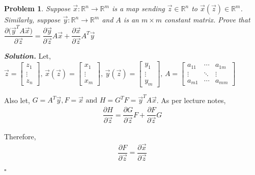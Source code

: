 \documentclass[11pt]{amsart}
\newtheorem{problem}{Problem}
\newenvironment{solution}[1][\it{Solution}]{\textbf{#1. } }{$\square$}
\theoremstyle{definition}
\newcommand{\R}{\mathbb{R}}
\newcommand{\vx}{\vec{x}}
\newcommand{\vy}{\vec{y}}
\newcommand{\vz}{\vec{z}}
\begin{document}
\begin{problem}
Suppose $\vx: \R^n\to \R^m$ is a map  sending $\vz\in \R^n$ to  $\vx(\vz)\in \R^m$. Similarly, 
suppose $\vy: \R^n\to \R^m$ and $A$ is an $m\times m$ constant matrix.
Prove that $\dfrac{\partial \big(\vy^TA\vx\big)}{\partial \vz}=
\dfrac{\partial \vy}{\partial \vz} A \vx+ \dfrac{\partial \vx}{\partial \vz} A^T \vy
$ 
\end{problem}

\begin{solution}
Let, $\vz = \begin{bmatrix}z_1\\\vdots\\z_n\end{bmatrix} \text{, } \vx(\vz) = \begin{bmatrix}x_1\\\vdots\\x_m\end{bmatrix} \text{, } \vy(\vz) = \begin{bmatrix}y_1\\\vdots\\y_m\end{bmatrix} \text{, } A = \left[\begin{array}{ccc}a_{11} & \cdots & a_{1m} \\ \vdots & \ddots & \vdots \\ a_{m1} & \cdots & a_{mm}\end{array}\right]$

Also let, $G = A^T\vy, F = \vx \text{ and } H = G^TF = \vy^TA\vx$. As per lecture notes,\\
\begin{align}
\dfrac{\partial H}{\partial \vz} = \dfrac{\partial G}{\partial \vz} F + \dfrac{\partial F}{\partial \vz} G
\end{align}

Therefore,
\begin{align}
\dfrac{\partial F}{\partial \vz} = \dfrac{\partial \vx}{\partial \vz}
\end{align}


\end{solution}
\end{document}
